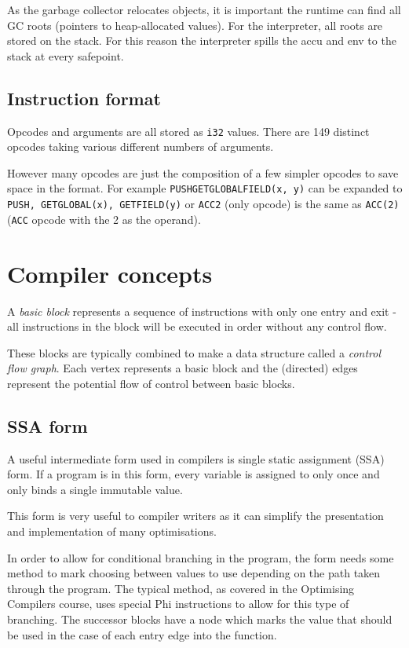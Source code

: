 As the garbage collector relocates objects, it is important the runtime can find all GC roots
(pointers to heap-allocated values). For the interpreter, all roots are stored on the stack. For
this reason the interpreter spills the accu and env to the stack at every safepoint.

\subsection{Instruction format} \label{ocaml-bytecode-format}

Opcodes and arguments are all stored as \texttt{i32} values. There are 149 distinct opcodes taking
various
different numbers of arguments.

However many opcodes are just the composition of a few simpler opcodes to save space in the format.
For example \texttt{PUSHGETGLOBALFIELD(x, y)} can be expanded to \texttt{PUSH,
    GETGLOBAL(x), GETFIELD(y)} or \texttt{ACC2} (only opcode) is the same as \texttt{ACC(2)}
(\texttt{ACC} opcode with the 2 as the operand).

\section{Compiler concepts}

A \emph{basic block} represents a sequence of instructions with only one entry and exit - all
instructions
in the block will be executed in order without any control flow.

These blocks are typically combined to make a data structure called a \emph{control flow graph}.
Each vertex represents a basic block and the (directed) edges represent the potential flow of
control between basic blocks.

\subsection{SSA form}

A useful intermediate form used in compilers is single static assignment (SSA) form. If a program
is in this form,
every variable is assigned to only once and only binds a single immutable value.

This form is very useful to compiler writers as it can simplify the presentation and implementation
of many optimisations.

In order to allow for conditional branching in the program, the form needs some method to mark
choosing between values to use depending on the path taken through the program. The typical
method, as covered in the Optimising Compilers course, uses special Phi instructions to allow for
this type
of branching. The successor blocks have a node which marks the value that should be used in the
case
of each entry edge into the function.

